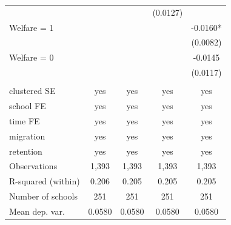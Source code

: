 \documentclass[12pt]{article}
\theoremstyle{plain}
\theoremstyle{plain}
\theoremstyle{plain}
\theoremstyle{definition}
\theoremstyle{plain}
\theoremstyle{definition}
\theoremstyle{plain}
\theoremstyle{remark}
\theoremstyle{definition}
\theoremstyle{definition}
\theoremstyle{plain}
\begin{document}
\begin{table}[H]
{\begin{tabular}{p{12.39em}llll}
			\multicolumn{1}{l}{} & \multicolumn{1}{c}{} & \multicolumn{1}{c}{} & \multicolumn{1}{c}{(0.0127)} & \multicolumn{1}{c}{} \\
			\multicolumn{1}{l}{Welfare = 1} & \multicolumn{1}{c}{} & \multicolumn{1}{c}{} & \multicolumn{1}{c}{} & \multicolumn{1}{c}{-0.0160*} \\
			\multicolumn{1}{l}{} & \multicolumn{1}{c}{} & \multicolumn{1}{c}{} & \multicolumn{1}{c}{} & \multicolumn{1}{c}{(0.0082)} \\
			\multicolumn{1}{l}{Welfare = 0} & \multicolumn{1}{c}{} & \multicolumn{1}{c}{} & \multicolumn{1}{c}{} & \multicolumn{1}{c}{-0.0145} \\
			\multicolumn{1}{l}{} & \multicolumn{1}{c}{} & \multicolumn{1}{c}{} & \multicolumn{1}{c}{} & \multicolumn{1}{c}{(0.0117)} \\
			\multicolumn{1}{l}{} & & & & \\
			\multicolumn{1}{l}{clustered SE} & \multicolumn{1}{c}{yes} & \multicolumn{1}{c}{yes} & \multicolumn{1}{c}{yes} & \multicolumn{1}{c}{yes} \\
			\multicolumn{1}{l}{school FE} & \multicolumn{1}{c}{yes} & \multicolumn{1}{c}{yes} & \multicolumn{1}{c}{yes} & \multicolumn{1}{c}{yes} \\
			\multicolumn{1}{l}{time FE} & \multicolumn{1}{c}{yes} & \multicolumn{1}{c}{yes} & \multicolumn{1}{c}{yes} & \multicolumn{1}{c}{yes} \\
			\multicolumn{1}{l}{migration} & \multicolumn{1}{c}{yes} & \multicolumn{1}{c}{yes} & \multicolumn{1}{c}{yes} & \multicolumn{1}{c}{yes} \\
			\multicolumn{1}{l}{retention} & \multicolumn{1}{c}{yes} & \multicolumn{1}{c}{yes} & \multicolumn{1}{c}{yes} & \multicolumn{1}{c}{yes} \\
			\multicolumn{1}{l}{Observations} & \multicolumn{1}{c}{1,393} & \multicolumn{1}{c}{1,393} & \multicolumn{1}{c}{1,393} & \multicolumn{1}{c}{1,393} \\
			\multicolumn{1}{l}{R-squared (within)} & \multicolumn{1}{c}{0.206} & \multicolumn{1}{c}{0.205} & \multicolumn{1}{c}{0.205} & \multicolumn{1}{c}{0.205} \\
			\multicolumn{1}{l}{Number of schools} & \multicolumn{1}{c}{251} & \multicolumn{1}{c}{251} & \multicolumn{1}{c}{251} & \multicolumn{1}{c}{251} \\
			\multicolumn{1}{l}{Mean dep. var.} & \multicolumn{1}{c}{0.0580} & \multicolumn{1}{c}{0.0580} & \multicolumn{1}{c}{0.0580} & \multicolumn{1}{c}{0.0580} \\

\end{tabular}}
\end{table}
\end{document}
